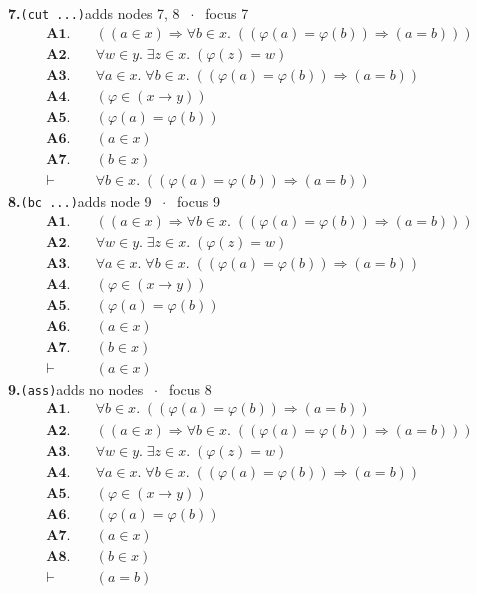 \documentclass[11pt]{article}
\begin{document}
\medskip\noindent\textbf{7.}\quad \texttt{(cut ...)}\hfill{\small adds nodes 7, 8 $\;\cdot\;$ focus 7}\\[2pt]
\begin{align*}
  \mathbf{A1.}\quad & ((a \in x) \Rightarrow \forall b \in x.\; ((\varphi(a) = \varphi(b)) \Rightarrow (a = b))) \\
  \mathbf{A2.}\quad & \forall w \in y.\; \exists z \in x.\; (\varphi(z) = w) \\
  \mathbf{A3.}\quad & \forall a \in x.\; \forall b \in x.\; ((\varphi(a) = \varphi(b)) \Rightarrow (a = b)) \\
  \mathbf{A4.}\quad & (\varphi \in (x \to y)) \\
  \mathbf{A5.}\quad & (\varphi(a) = \varphi(b)) \\
  \mathbf{A6.}\quad & (a \in x) \\
  \mathbf{A7.}\quad & (b \in x) \\
  \vdash\quad & \forall b \in x.\; ((\varphi(a) = \varphi(b)) \Rightarrow (a = b))
\end{align*}
\medskip\noindent\textbf{8.}\quad \texttt{(bc ...)}\hfill{\small adds node 9 $\;\cdot\;$ focus 9}\\[2pt]
\begin{align*}
  \mathbf{A1.}\quad & ((a \in x) \Rightarrow \forall b \in x.\; ((\varphi(a) = \varphi(b)) \Rightarrow (a = b))) \\
  \mathbf{A2.}\quad & \forall w \in y.\; \exists z \in x.\; (\varphi(z) = w) \\
  \mathbf{A3.}\quad & \forall a \in x.\; \forall b \in x.\; ((\varphi(a) = \varphi(b)) \Rightarrow (a = b)) \\
  \mathbf{A4.}\quad & (\varphi \in (x \to y)) \\
  \mathbf{A5.}\quad & (\varphi(a) = \varphi(b)) \\
  \mathbf{A6.}\quad & (a \in x) \\
  \mathbf{A7.}\quad & (b \in x) \\
  \vdash\quad & (a \in x)
\end{align*}
\medskip\noindent\textbf{9.}\quad \texttt{(ass)}\hfill{\small adds no nodes $\;\cdot\;$ focus 8}\\[2pt]
\begin{align*}
  \mathbf{A1.}\quad & \forall b \in x.\; ((\varphi(a) = \varphi(b)) \Rightarrow (a = b)) \\
  \mathbf{A2.}\quad & ((a \in x) \Rightarrow \forall b \in x.\; ((\varphi(a) = \varphi(b)) \Rightarrow (a = b))) \\
  \mathbf{A3.}\quad & \forall w \in y.\; \exists z \in x.\; (\varphi(z) = w) \\
  \mathbf{A4.}\quad & \forall a \in x.\; \forall b \in x.\; ((\varphi(a) = \varphi(b)) \Rightarrow (a = b)) \\
  \mathbf{A5.}\quad & (\varphi \in (x \to y)) \\
  \mathbf{A6.}\quad & (\varphi(a) = \varphi(b)) \\
  \mathbf{A7.}\quad & (a \in x) \\
  \mathbf{A8.}\quad & (b \in x) \\
  \vdash\quad & (a = b)
\end{align*}
\end{document}
